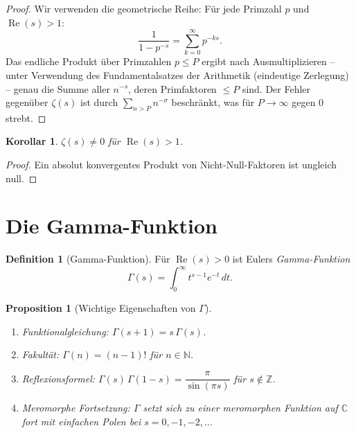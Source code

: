 \documentclass[12pt,a4paper]{amsart}
\newtheorem{corollary}[theorem]{Korollar}
\newtheorem{proposition}[theorem]{Proposition}
\theoremstyle{definition}
\newtheorem{definition}[theorem]{Definition}
\newcommand{\N}{\mathbb{N}}
\newcommand{\Z}{\mathbb{Z}}
\newcommand{\C}{\mathbb{C}}
\DeclareMathOperator{\Re}{Re}
\begin{document}
\begin{proof}
Wir verwenden die geometrische Reihe: F\"ur jede Primzahl $p$ und $\Re(s)>1$:
\[
  \frac{1}{1 - p^{-s}} = \sum_{k=0}^{\infty} p^{-ks}.
\]
Das endliche Produkt \"uber Primzahlen $p \le P$ ergibt nach Ausmultiplizieren
-- unter Verwendung des Fundamentalsatzes der Arithmetik (eindeutige
Zerlegung) -- genau die Summe aller $n^{-s}$, deren Primfaktoren $\le P$ sind.
Der Fehler gegen\"uber $\zeta(s)$ ist durch $\sum_{n>P} n^{-\sigma}$
beschr\"ankt, was f\"ur $P \to \infty$ gegen $0$ strebt.
\end{proof}

\begin{corollary}
$\zeta(s) \ne 0$ f\"ur $\Re(s) > 1$.
\end{corollary}

\begin{proof}
Ein absolut konvergentes Produkt von Nicht-Null-Faktoren ist ungleich null.
\end{proof}

\section{Die Gamma-Funktion}
\label{sec:gamma}

\begin{definition}[Gamma-Funktion]
\label{def:gamma}
F\"ur $\Re(s) > 0$ ist Eulers \emph{Gamma-Funktion}
\[
  \Gamma(s) = \int_0^{\infty} t^{s-1} e^{-t}\,dt.
\]
\end{definition}

\begin{proposition}[Wichtige Eigenschaften von $\Gamma$]
\label{prop:gamma_props}
\begin{enumerate}
  \item[\textup{(i)}] \textit{Funktionalgleichung:} $\Gamma(s+1) = s\,\Gamma(s)$.
  \item[\textup{(ii)}] \textit{Fakult\"at:} $\Gamma(n) = (n-1)!$ f\"ur $n \in \N$.
  \item[\textup{(iii)}] \textit{Reflexionsformel:}
    $\Gamma(s)\,\Gamma(1-s) = \dfrac{\pi}{\sin(\pi s)}$
    f\"ur $s \notin \Z$.
  \item[\textup{(iv)}] \textit{Meromorphe Fortsetzung:} $\Gamma$ setzt sich zu
    einer meromorphen Funktion auf $\C$ fort mit einfachen Polen bei
    $s = 0, -1, -2, \ldots$
\end{enumerate}
\end{proposition}
\end{document}
